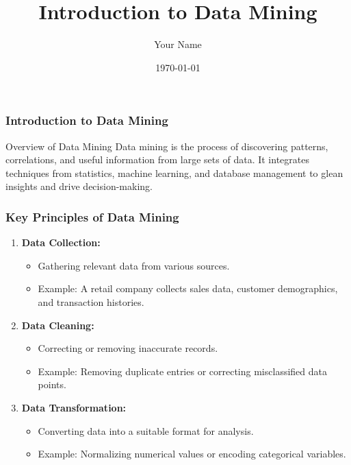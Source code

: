 \documentclass{beamer}
\title{Introduction to Data Mining}
\author{Your Name}
\institute{Your Institution}
\date{\today}
\begin{document}
\frame{\titlepage}

\begin{frame}[fragile]
    \frametitle{Introduction to Data Mining}
    \begin{block}{Overview of Data Mining}
        Data mining is the process of discovering patterns, correlations, and useful information from large sets of data. It integrates techniques from statistics, machine learning, and database management to glean insights and drive decision-making.
    \end{block}
\end{frame}

\begin{frame}[fragile]
    \frametitle{Key Principles of Data Mining}
    \begin{enumerate}
        \item \textbf{Data Collection:}
        \begin{itemize}
            \item Gathering relevant data from various sources.
            \item Example: A retail company collects sales data, customer demographics, and transaction histories.
        \end{itemize}
        
        \item \textbf{Data Cleaning:}
        \begin{itemize}
            \item Correcting or removing inaccurate records.
            \item Example: Removing duplicate entries or correcting misclassified data points.
        \end{itemize}
        
        \item \textbf{Data Transformation:}
        \begin{itemize}
            \item Converting data into a suitable format for analysis.
            \item Example: Normalizing numerical values or encoding categorical variables.
        \end{itemize}
    \end{enumerate}
\end{frame}
\end{document}
